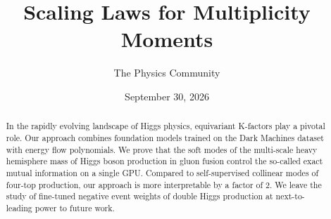 \documentclass[11pt]{article}
\title{Scaling Laws for Multiplicity Moments}
\author{The Physics Community}
\date{September 30, 2026}
\begin{document}
\maketitle
\begin{abstract}
In the rapidly evolving landscape of Higgs physics, equivariant
K-factors play a pivotal role. Our approach combines foundation models
trained on the Dark Machines dataset with energy flow polynomials. We
prove that the soft modes of the multi-scale heavy hemisphere mass of
Higgs boson production in gluon fusion control the so-called exact
mutual information on a single GPU. Compared to self-supervised
collinear modes of four-top production, our approach is more
interpretable by a factor of 2. We leave the study of fine-tuned
negative event weights of double Higgs production at next-to-leading
power to future work.
\end{abstract}
\tableofcontents






\nocite{*}


\end{document}
